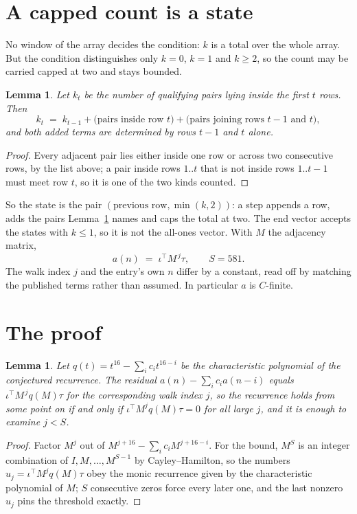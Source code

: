 \documentclass[11pt,a4paper]{article}
\theoremstyle{plain}
\newtheorem{lemma}[theorem]{Lemma}
\theoremstyle{definition}
\begin{document}
\section{A capped count is a state}

No window of the array decides the condition: $k$ is a total over the whole array. But the
condition distinguishes only $k=0$, $k=1$ and $k\ge2$, so the count may be carried capped at
two and stays bounded.

\begin{lemma}\label{lem:cap}
Let $k_t$ be the number of qualifying pairs lying inside the first $t$ rows. Then
\[
k_{t}\;=\;k_{t-1}+\bigl(\text{pairs inside row } t\bigr)
+\bigl(\text{pairs joining rows } t-1 \text{ and } t\bigr),
\]
and both added terms are determined by rows $t-1$ and $t$ alone.
\end{lemma}

\begin{proof}
Every adjacent pair lies either inside one row or across two consecutive rows, by the list
above; a pair inside rows $1..t$ that is not inside rows $1..t-1$ must meet row $t$, so it is
one of the two kinds counted.
\end{proof}

So the state is the pair $(\text{previous row},\min(k,2))$: a step appends a row, adds the
pairs Lemma~\ref{lem:cap} names and caps the total at two. The end vector accepts the states
with $k\le1$, so it is not the all-ones vector. With $M$ the adjacency matrix,
\[
a(n)\;=\;\iota^{\!\top}M^{\,j}\tau ,\qquad S=581.
\]
The walk index $j$ and the entry's own $n$ differ by a constant, read off by matching the
published terms rather than assumed. In particular $a$ is $C$-finite.

\section{The proof}

\begin{lemma}\label{lem:crit}
Let $q(t)=t^{16}-\sum_i c_it^{16-i}$ be the characteristic polynomial of the
conjectured recurrence. The residual $a(n)-\sum_ic_ia(n-i)$ equals
$\iota^{\!\top}M^{\,j}q(M)\tau$ for the corresponding walk index $j$, so the recurrence
holds from some point on if and only if $\iota^{\!\top}M^{j}q(M)\tau=0$ for all large $j$,
and it is enough to examine $j<S$.
\end{lemma}

\begin{proof}
Factor $M^{j}$ out of $M^{j+16}-\sum_ic_iM^{j+16-i}$. For the bound, $M^{S}$
is an integer combination of $I,M,\dots,M^{S-1}$ by Cayley--Hamilton, so the numbers
$u_j=\iota^{\!\top}M^{j}q(M)\tau$ obey the monic recurrence given by the characteristic
polynomial of $M$; $S$ consecutive zeros force every later one, and the last nonzero $u_j$
pins the threshold exactly.
\end{proof}
\end{document}
